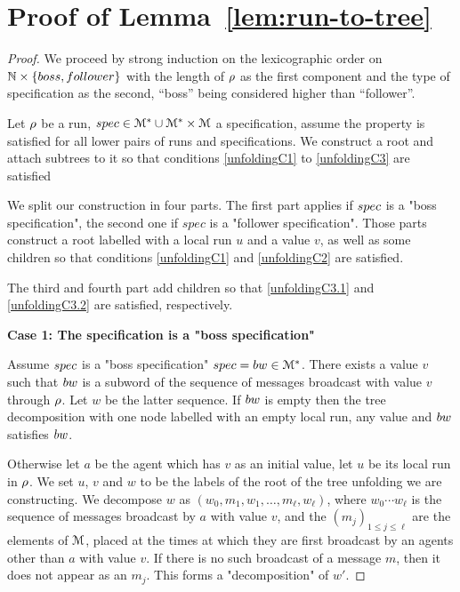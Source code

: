 \section{Proof of Lemma~\ref{lem:run-to-tree}}

\LemRunToTree*

\begin{proof}
	
	We proceed by strong induction on the lexicographic order on $\mathbb{N} \times \{boss, follower\}$ with the length of $\rho$ as the first component and the type of specification as the second, ``boss'' being considered higher than ``follower''. 
	
	Let $\rho$ be a run, $\spec \in \messages^* \cup \messages^* \times \messages$ a specification, assume the property is satisfied for all lower pairs of runs and specifications. We construct a root and attach subtrees to it so that conditions \ref{unfoldingC1} to \ref{unfoldingC3} are satisfied 
	
	We split our construction in four parts. The first part applies if $\spec$ is a "boss specification", the second one if $spec$ is a "follower specification". 
	Those parts construct a root labelled with a local run $u$ and a value $v$, as well as some children so that conditions \ref{unfoldingC1} and \ref{unfoldingC2} are satisfied.
	
	The third and fourth part add children so that \ref{unfoldingC3.1} and \ref{unfoldingC3.2} are satisfied, respectively.
	
	\textbf{Case 1: The specification is a "boss specification"}
	
	Assume $\spec$ is a "boss specification" $\spec = \bossspec \in \messages^*$.
	There exists a value $v$ such that $\bossspec$ is a subword of the sequence of messages broadcast with value $v$ through $\rho$. Let $w$ be the latter sequence.
	If $\bossspec$ is empty then the tree decomposition with one node labelled with an empty local run, any value and $\bossspec$ satisfies $\bossspec$.	
	
	Otherwise let $a$ be the agent which has $v$ as an initial value, let $u$ be its local run in $\rho$. We set $u$, $v$ and $w$ to be the labels of the root of the tree unfolding we are constructing.
	We decompose $w$ as $(w_0, m_1, w_1, \ldots, m_\ell, w_\ell)$, where $w_0\cdots w_\ell$ is the sequence of messages broadcast by $a$ with value $v$, and the $(m_j)_{1\leq j\leq \ell}$ are the elements of $\mathcal{M}$, placed at the times at which they are first broadcast by an agents other than $a$ with value $v$. If there is no such broadcast of a message $m$, then it does not appear as an $m_j$. This forms a "decomposition" of $w'$.
	

\end{proof}
